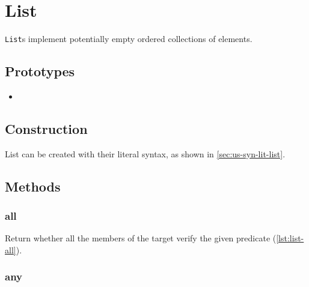 \section{List}

\lstinline|List|s implement potentially empty ordered collections of
elements.

\subsection{Prototypes}

\begin{itemize}
\item {}
\end{itemize}

\subsection{Construction}

List can be created with their literal syntax, as shown in
\autoref{sec:us-syn-lit-list}.


\subsection{Methods}

\subsubsection{all}

Return whether all the members of the target verify the given
predicate (\autoref{lst:list-all}).


\subsubsection{any}

